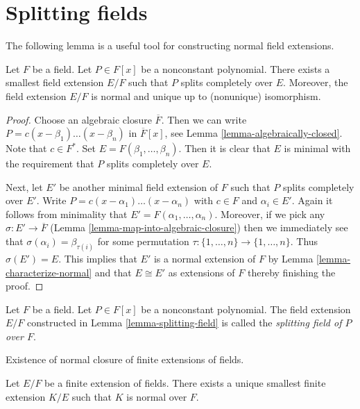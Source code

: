\section{Splitting fields}
\label{section-splitting-fieds}

\noindent
The following lemma is a useful tool for constructing normal field extensions.

\begin{lemma}
\label{lemma-splitting-field}
Let $F$ be a field. Let $P \in F[x]$ be a nonconstant polynomial.
There exists a smallest field extension $E/F$ such that $P$
splits completely over $E$. Moreover, the field extension $E/F$ is normal
and unique up to (nonunique) isomorphism.
\end{lemma}

\begin{proof}
Choose an algebraic closure $\overline{F}$. Then we can write
$P = c (x - \beta_1) \ldots (x - \beta_n)$ in $\overline{F}[x]$, see
Lemma \ref{lemma-algebraically-closed}. Note that $c \in F^*$. Set
$E = F(\beta_1, \ldots, \beta_n)$. Then it is clear that $E$ is
minimal with the requirement that $P$ splits completely over $E$.

\medskip\noindent
Next, let $E'$ be another minimal field extension of $F$ such that
$P$ splits completely over $E'$. Write
$P = c (x - \alpha_1) \ldots (x - \alpha_n)$ with $c \in F$ and
$\alpha_i \in E'$. Again it follows from minimality that
$E' = F(\alpha_1, \ldots, \alpha_n)$. Moreover, if we pick
any $\sigma : E' \to \overline{F}$
(Lemma \ref{lemma-map-into-algebraic-closure})
then we immediately see that $\sigma(\alpha_i) = \beta_{\tau(i)}$
for some permutation $\tau : \{1, \ldots, n\} \to \{1, \ldots, n\}$.
Thus $\sigma(E') = E$. This implies that $E'$ is a normal extension
of $F$ by Lemma \ref{lemma-characterize-normal}
and that $E \cong E'$ as extensions of $F$ thereby finishing the proof.
\end{proof}

\begin{definition}
\label{definition-splitting-field}
Let $F$ be a field. Let $P \in F[x]$ be a nonconstant polynomial.
The field extension $E/F$ constructed in Lemma \ref{lemma-splitting-field}
is called the {\it splitting field of $P$ over $F$}.
\end{definition}

\begin{lemma}
\label{lemma-normal-closure}
\begin{slogan}
Existence of normal closure of finite extensions of fields.
\end{slogan}
Let $E/F$ be a finite extension of fields. There exists a unique
smallest finite extension $K/E$ such that $K$ is normal over $F$.
\end{lemma}

